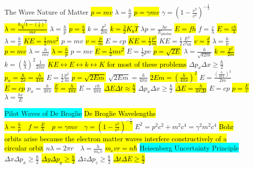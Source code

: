 \documentclass[6pt, oneside]{article}   	%
\begin{document}
\colorbox{BurntOrange}{The Wave Nature of Matter}
\hl{$p=mv$}
$\lambda = \frac{h}{p}$
\hl{$p = \gamma mv$}
$\gamma = (1-\frac{v^2}{c^2})^{-\frac{1}{2}}$
\hl{$\lambda = \frac{h \sqrt{1-(\frac{v}{c})^2}}{mv}$}
$\lambda = \frac{h}{p}$
\hl{$p = \frac{h}{\lambda}$}
$k = \frac{p^2}{2m}$
\hl{$k = \frac{3}{2}K_bT$}
$\lambda p = \frac{hc}{E_{photon}}$
\hl{$E = fh$}
$f = \frac{c}{\lambda}$
\hl{$E = \frac{ch}{\lambda}$}
$\lambda = \frac{h}{p}$
\hl{$KE = \frac{1}{2}mv^2$}
$p=mv$
\hl{$v=\frac{p}{m}$}
$E=cp$
\hl{$KE = \frac{1}{2} \frac{p^2}{m}$}
$KE = \frac{1}{2}\frac{E^2}{c^2 m}$
\hl{$v = \frac{d}{t}$}
$\lambda = \frac{h}{p}$
\hl{$p = mv$}
$\lambda = \frac{h}{mv}$
\hl{$\lambda = \frac{h}{p}$}
$p = mv$
\hl{$E = \frac{1}{2}mv^2$}
$E = \frac{1}{2}pv$
\hl{$p=\sqrt{2E}$}
$\lambda = \frac{h}{\sqrt{k2m}}$
\hl{$k = \frac{p^2}{2m}$}
$k = (\frac{h}{\lambda})^2 \frac{1}{2me}$
\hl{$KE\leftrightarrow E\leftrightarrow k \leftrightarrow K$ for most of these problems}
$\Delta p_x \Delta x \geq \frac{\hbar}{2}$ 
\hl{$p_x = \frac{\hbar}{2x} = \frac{h}{4\pi x}$}
$E = \frac{1}{2}\frac{p^2}{m}$
\hl{$p = \sqrt{2Em}$}
$\sqrt{2Em} = \frac{h}{4\pi x}$
\hl{$2Em = ( \frac{h}{4 \pi x} )^2$}
$E = \frac{( \frac{h}{4\pi x})^2}{2m}$
\hl{$E = cp$}
$p_x = \frac{h}{4\pi x}$
\hl{$\frac{E}{c} = \frac{h}{4\pi x}$}
$E = \frac{ch}{4\pi x}$
\hl{$\Delta E \Delta t \approx \frac{\hbar}{2}$}
$\Delta p_x \Delta x \geq \frac{\hbar}{2}$
\hl{$\Delta E = \frac{h}{4\pi \Delta t}$}
$E = cp$
\hl{$p = \frac{E}{c}$}
$\lambda = \frac{hc}{E} $


\colorbox{Cyan}{Pilot Waves of De Broglie}
\hl{De Broglie Wavelengths $\lambda = \frac{h}{p} \quad f = \frac{E}{h} \quad p = \gamma mv \quad \gamma = (1-\frac{v^2}{c^2})^{-\frac{1}{2}}$}
$E^2 = p^2c^2 + m^2c^4 = \gamma^2m^2c^4$
\hl{Bohr orbits arise because the electron matter waves interfere constructively of a circular orbit}
$n\lambda = 2\pi r \quad \lambda = \frac{h}{m_ev}$
\hl{$m_evr = n\hbar$}
\colorbox{Cyan}{Heisenberg Uncertainty Principle}
$\Delta x \Delta p_x \geq \frac{\hbar}{2}$
\hl{$\Delta y \Delta p_y \geq \frac{\hbar}{2}$}
$\Delta z \Delta p_z \geq \frac{\hbar}{2}$
\hl{$\Delta t \Delta E \geq \frac{\hbar}{2}$}
\end{document}

